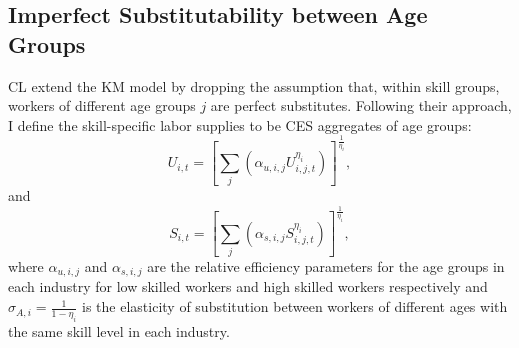 \documentclass[]{article}
\begin{document}
\subsection{Imperfect Substitutability between Age Groups}

CL extend the KM model by dropping the assumption that, within skill
groups, workers of different age groups $j$ are perfect
substitutes. Following their approach, I define the skill-specific
labor supplies to be CES aggregates of age groups:
\begin{equation}
  \label{eq:2}
  U_{i,t}=\left[ \sum_{j}(\alpha_{u,i,j}U_{i,j,t}^{\eta_{i}}) \right]^{\frac{1}{\eta_{i}}},
\end{equation}
and
\begin{equation}
  \label{eq:3}
  S_{i,t}=\left[ \sum_{j}(\alpha_{s,i,j}S_{i,j,t}^{\eta_{i}}) \right]^{\frac{1}{\eta_{i}}},
\end{equation}
where $\alpha_{u,i,j}$ and $\alpha_{s,i,j}$ are the relative
efficiency parameters for the age groups in each industry for low
skilled workers and high skilled workers respectively and
$\sigma_{A,i}=\frac{1}{1-\eta_{i}}$ is the elasticity of substitution
between workers of different ages with the same skill level in each
industry.
\end{document}
